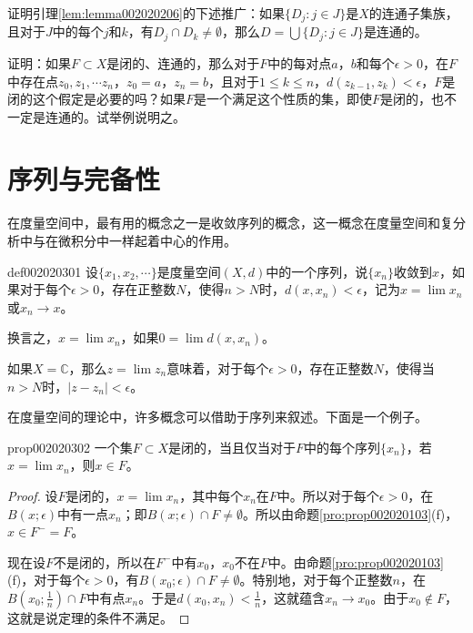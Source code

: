 \begin{exercise}
证明引理\ref{lem:lemma002020206}的下述推广：如果$\{D_j:j \in J\}$是$X$的连通子集族，且对于$J$中的每个$j$和$k$，有$D_j \cap D_k \neq \emptyset$，那么$D = \bigcup\{D_j: j \in J\}$是连通的。
\end{exercise}

\begin{exercise}
证明：如果$F \subset X$是闭的、连通的，那么对于$F$中的每对点$a$，$b$和每个$\epsilon > 0$，在$F$中存在点$z_0, z_1,\cdots z_n$，$z_0=a$，$z_n=b$，且对于$1 \le k \le n$，$d(z_{k-1}, z_k) < \epsilon$，$F$是闭的这个假定是必要的吗？如果$F$是一个满足这个性质的集，即使$F$是闭的，也不一定是连通的。试举例说明之。
\end{exercise}


\section{序列与完备性}\label{section0020203}
在度量空间中，最有用的概念之一是收敛序列的概念，这一概念在度量空间和复分析中与在微积分中一样起着中心的作用。

\begin{definition}{}{def002020301}
设$\{x_1,x_2,\cdots\}$是度量空间$(X,d)$中的一个序列，说$\{x_n\}$收敛到$x$，如果对于每个$\epsilon > 0$，存在正整数$N$，使得$n > N$时，$d(x, x_n) < \epsilon$，记为$x = \lim{x_n}$或$x_n \to x$。
\end{definition}

换言之，$x = \lim{x_n}$，如果$0 = \lim{d(x, x_n)}$。

如果$X = \mathbb{C}$，那么$z = \lim{z_n}$意味着，对于每个$\epsilon > 0$，存在正整数$N$，使得当$n > N$时，$|z - z_n| < \epsilon$。

在度量空间的理论中，许多概念可以借助于序列来叙述。下面是一个例子。

\begin{proposition}{}{prop002020302}
一个集$F \subset X$是闭的，当且仅当对于$F$中的每个序列$\{x_n\}$，若$x = \lim{x_n}$，则$x \in F$。
\end{proposition}

\begin{proof}
设$F$是闭的，$x = \lim{x_n}$，其中每个$x_n$在$F$中。所以对于每个$\epsilon > 0$，在$B(x;\epsilon)$中有一点$x_n$；即$B(x;\epsilon) \cap F \neq \emptyset$。所以由命题\ref{pro:prop002020103}(f)，$x \in F^- = F$。

现在设$F$不是闭的，所以在$F^-$中有$x_0$，$x_0$不在$F$中。由命题\ref{pro:prop002020103}(f)，对于每个$\epsilon > 0$，有$B(x_0;\epsilon) \cap F \neq \emptyset$。特别地，对于每个正整数$n$，在$B(x_0; \frac{1}{n}) \cap F$中有点$x_n$。于是$d(x_0, x_n) < \frac{1}{n}$，这就蕴含$x_n \to x_0$。由于$x_0 \not\in F$，这就是说定理的条件不满足。
\end{proof}

